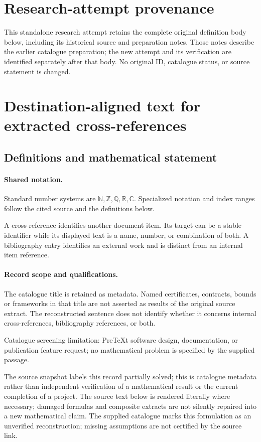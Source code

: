 \documentclass[11pt]{article}
\begin{document}
\section*{Research-attempt provenance}
This standalone research attempt retains the complete original definition body below,
including its historical source and preparation notes. Those notes describe the
earlier catalogue preparation; the new attempt and its verification are identified
separately after that body. No original ID, catalogue status, or source statement is changed.

\section{Destination-aligned text for extracted cross-references}\label{statement}

\subsection{Definitions and mathematical statement}

\paragraph{Shared notation.}Standard number systems are $\mathbb N,\mathbb Z,\mathbb Q,\mathbb R,\mathbb C$. Specialized notation and index ranges follow the cited source and the definitions below.


A cross-reference identifies another document item. Its target can be a stable identifier while its displayed text is a name, number, or combination of both. A bibliography entry identifies an external work and is distinct from an internal item reference.
\paragraph{Record scope and qualifications.}
The catalogue title is retained as metadata. Named certificates, contracts, bounds or frameworks in that title are not asserted as results of the original source extract.
The reconstructed sentence does not identify whether it concerns internal cross-references, bibliography references, or both.

Catalogue screening limitation: PreTeXt software design, documentation, or publication feature request; no mathematical problem is specified by the supplied passage.

The source snapshot labels this record partially solved; this is catalogue metadata rather than independent verification of a mathematical result or the current completion of a project.
The source text below is rendered literally where necessary; damaged formulas and composite extracts are not silently repaired into a new mathematical claim.
The supplied catalogue marks this formulation as an unverified reconstruction; missing assumptions are not certified by the source link.
\end{document}
